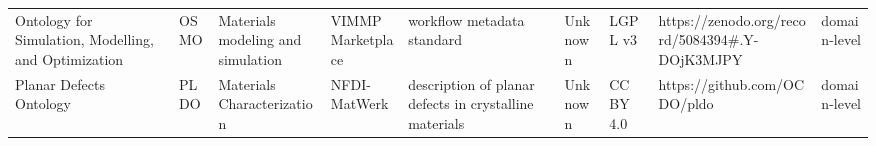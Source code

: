 \begin{tabular}{m{5cm}m{2cm}m{5cm}m{2cm}m{2cm}m{2cm}m{2cm}m{2cm}m{2cm}}
                             Ontology for Simulation, Modelling, and Optimization &                    OSMO &           Materials modeling and simulation &                                                                                                                                                                                                                                                                                                                                                    VIMMP Marketplace &                                                                                                                                                                                                                                                                                                                                                                             workflow metadata standard &                                                                                                            Unknown &                                      LGPL v3 &                                                     https://zenodo.org/record/5084394#.Y-DOjK3MJPY &      domain-level \\
                                                          Planar Defects Ontology &                    PLDO &                  Materials Characterization &                                                                                                                                                                                                                                                                                                                                                         NFDI-MatWerk &                                                                                                                                                                                                                                                                                                                                                 description of planar defects in crystalline materials &                                                                                                            Unknown &                                    CC BY 4.0 &                                                                       https://github.com/OCDO/pldo &      domain-level \\

\end{tabular}
